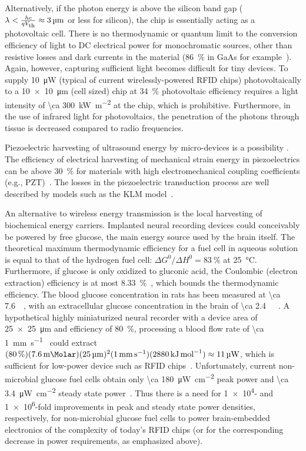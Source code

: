 Alternatively, if the photon energy is above the silicon band gap ($\lambda < \frac{h c}{qV_{\text{\scriptsize th}}} \approx \SI{3}{\micro\meter}$ or less for silicon), the chip is essentially acting as a photovoltaic cell.
There is no thermodynamic or quantum limit to the conversion efficiency of light to DC electrical power for monochromatic sources, other than resistive losses and dark currents in the material (\SI{86}{\percent} in GaAs for example~\cite{bett08}). Again, however, capturing sufficient light becomes difficult for tiny devices.
To supply \SI{10}{\micro\watt} (typical of current wirelessly-powered RFID chips) photovoltaically to a \SI{10 x 10}{\micro\meter} (cell sized) chip at \SI{34}{\percent} photovoltaic efficiency requires a light intensity of \SI{\ca 300}{\kilo\watt\per\meter\squared} at the chip, which is prohibitive. Furthermore, in the use of infrared light for photovoltaics, the penetration of the photons through tissue is decreased compared to radio frequencies.

Piezoelectric harvesting of ultrasound energy by micro-devices is a possibility \cite{Seo2013}. The efficiency of electrical harvesting of mechanical strain energy in piezoelectrics can be above \SI{30}{\percent} for materials with high electromechanical coupling coefficients (e.g., PZT)~\cite{safari08, xu12}. The losses in the piezoelectric transduction process are well described by models such as the KLM model~\cite{krimholtz70,castillo03}. 

An alternative to wireless energy transmission is the local harvesting of biochemical energy carriers. Implanted neural recording devices could conceivably be powered by free glucose, the main energy source used by the brain itself.
The theoretical maximum thermodynamic efficiency for a fuel cell in aqueous solution is equal to that of the hydrogen fuel cell: $\Delta G^0/\Delta H^0 = \SI{83}{\percent}$ at \SI{25}{\degreeCelsius}.
Furthermore, if glucose is only oxidized to gluconic acid, the Coulombic (electron extraction) efficiency is at most \SI{8.33}{\percent}~\cite{rapoport12}, which bounds the thermodynamic efficiency.
The blood glucose concentration in rats has been measured at \SI{\ca 7.6}{\milli\Molar}, with an extracellular glucose concentration in the brain of \SI{\ca 2.4}{\milli\Molar}~\cite{silver94}.
A hypothetical highly miniaturized neural recorder with a device area of \SI{25 x 25}{\micro\meter} and efficiency of \SI{80}{\percent}, processing a blood flow rate of \SI{\ca 1}{\milli\meter\per\second}~\cite{ivanov81} could extract $(\SI{80}{\percent})(\SI{7.6}{\milli\Molar})(\SI{25}{\micro\meter})^2(\SI{1}{\milli\meter\per\second})(\SI{2880}{\kilo\joule\per\mole})\approx \SI{11}{\micro\watt}$, which is sufficient for low-power device such as RFID chips~\cite{cho05}.
Unfortunately, current non-microbial glucose fuel cells obtain only \SI{\ca 180}{\micro\watt\per\centi\meter\squared} peak power and \SI{\ca 3.4}{\micro\watt\per\centi\meter\squared} steady state power~\cite{rapoport12}.
Thus there is a need for \num{1e4}- and \num{1e6}-fold improvements in peak and steady state power densities, respectively, for non-microbial glucose fuel cells to power brain-embedded electronics of the complexity of today's RFID chips (or for the corresponding decrease in power requirements, as emphasized above).

